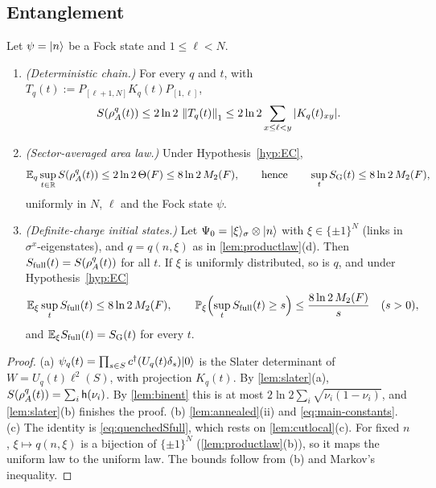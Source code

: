 \subsection{Entanglement}\label{sec:main:entanglement}

\begin{theorem}\label{thm:arealaw}
Let $\psi=|n\rangle$ be a Fock state and $1\le\ell<N$.
\begin{enumerate}[label=(\alph*)]
\item \emph{(Deterministic chain.)}  For every $q$ and $t$, with $T_q(t):=P_{[\ell+1,N]}K_q(t)P_{[1,\ell]}$,
\[
  S(\rho^q_A(t))\le2\ln2\,\left\|T_q(t)\right\|_1\le2\ln2\sum_{x\le\ell<y}|K_q(t)_{xy}| .
\]
\item \emph{(Sector-averaged area law.)}  Under Hypothesis~\ref{hyp:EC},
\[
  \mathbb{E}_q\sup_{t\in\mathbb{R}}S(\rho^q_A(t))\le2\ln2\,\Theta(F)\le8\ln2\,M_2(F),\qquad\text{hence}\qquad
  \sup_tS_{\mathrm{G}}(t)\le8\ln2\,M_2(F),
\]
uniformly in $N$, $\ell$ and the Fock state $\psi$.
\item \emph{(Definite-charge initial states.)}  Let $\Psi_0=|\xi\rangle_\sigma\otimes|n\rangle$ with
$\xi\in\{\pm1\}^N$ (links in $\sigma^x$-eigenstates), and $q=q(n,\xi)$ as in \cref{lem:productlaw}(d).  Then
$S_{\mathrm{full}}(t)=S(\rho^q_A(t))$ for all $t$.  If $\xi$ is uniformly distributed, so is $q$, and under
Hypothesis~\ref{hyp:EC}
\[
  \mathbb{E}_\xi\sup_tS_{\mathrm{full}}(t)\le8\ln2\,M_2(F),\qquad
  \mathbb{P}_\xi\Bigl(\sup_tS_{\mathrm{full}}(t)\ge s\Bigr)\le\frac{8\ln2\,M_2(F)}{s}\quad(s>0),
\]
and $\mathbb{E}_\xi S_{\mathrm{full}}(t)=S_{\mathrm{G}}(t)$ for every $t$.
\end{enumerate}
\end{theorem}

\begin{proof}
(a) $\psi_q(t)=\prod_{s\in S}c^\dagger(U_q(t)\delta_s)|0\rangle$ is the Slater determinant of $W=U_q(t)\ell^2(S)$,
with projection $K_q(t)$.  By \cref{lem:slater}(a), $S(\rho^q_A(t))=\sum_i\mathsf{h}(\nu_i)$.  By \cref{lem:binent}
this is at most $2\ln2\sum_i\sqrt{\nu_i(1-\nu_i)}$, and \cref{lem:slater}(b) finishes the proof.  (b)
\cref{lem:annealed}(ii) and \eqref{eq:main-constants}.  (c) The identity is \eqref{eq:quenchedSfull}, which rests
on \cref{lem:cutlocal}(c).  For fixed $n$, $\xi\mapsto q(n,\xi)$ is a bijection of $\{\pm1\}^N$
(\cref{lem:productlaw}(b)), so it maps the uniform law to the uniform law.  The bounds follow from (b) and
Markov's inequality.
\end{proof}

